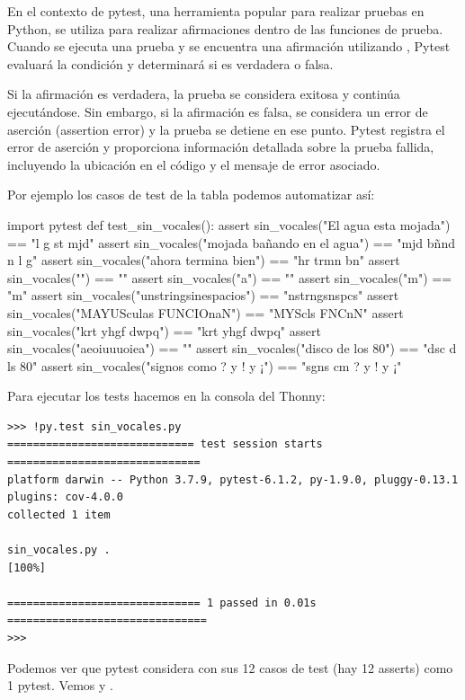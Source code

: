 En el contexto de pytest, una herramienta popular para realizar pruebas en Python,  se utiliza para realizar afirmaciones dentro de las funciones de prueba. Cuando se ejecuta una prueba y se encuentra una afirmación utilizando , Pytest evaluará la condición y determinará si es verdadera o falsa.

Si la afirmación es verdadera, la prueba se considera exitosa y continúa ejecutándose. Sin embargo, si la afirmación es falsa, se considera un error de aserción (assertion error) y la prueba se detiene en ese punto. Pytest registra el error de aserción y proporciona información detallada sobre la prueba fallida, incluyendo la ubicación en el código y el mensaje de error asociado.

Por ejemplo los casos de test de la tabla podemos automatizar así:

\begin{python}
import pytest
def test_sin_vocales():
    assert sin_vocales("El agua esta mojada") == "l g st mjd"
    assert sin_vocales("mojada bañando en el agua") == "mjd bñnd n l g"
    assert sin_vocales("ahora termina bien") == "hr trmn bn"
    assert sin_vocales("") == ""
    assert sin_vocales("a") == ""
    assert sin_vocales("m") == "m"
    assert sin_vocales("unstringsinespacios") == "nstrngsnspcs"
    assert sin_vocales("MAYUSculas FUNCIOnaN") == "MYScls FNCnN"
    assert sin_vocales("krt yhgf dwpq") == "krt yhgf dwpq"
    assert sin_vocales("aeoiuuuoiea") == ""
    assert sin_vocales("disco de los 80") == "dsc d ls 80"
    assert sin_vocales("signos como ? y ! y ¡") == "sgns cm ? y ! y ¡"
\end{python}

Para ejecutar los tests hacemos en la consola del Thonny:

\begin{Verbatim}[frame=single]
>>> !py.test sin_vocales.py
============================= test session starts ==============================
platform darwin -- Python 3.7.9, pytest-6.1.2, py-1.9.0, pluggy-0.13.1
plugins: cov-4.0.0
collected 1 item

sin_vocales.py .                                                         [100%]

============================== 1 passed in 0.01s ===============================
>>> 
\end{Verbatim}

Podemos ver que pytest considera  con sus 12 casos de test (hay 12 asserts) como 1 pytest. Vemos  y .

